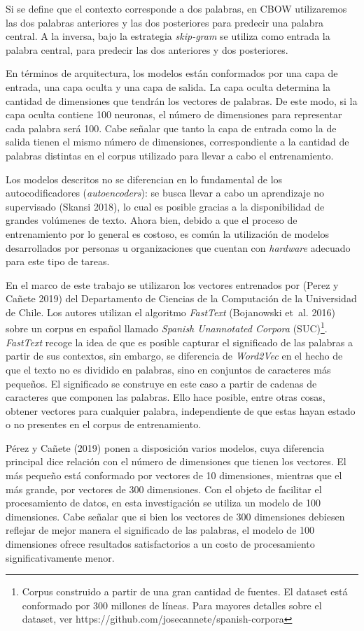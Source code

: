 \documentclass[
  12pt,
]{article}
\begin{document}
Si se define que el contexto corresponde a dos palabras, en CBOW
utilizaremos las dos palabras anteriores y las dos posteriores para
predecir una palabra central. A la inversa, bajo la estrategia
\emph{skip-gram} se utiliza como entrada la palabra central, para
predecir las dos anteriores y dos posteriores.

En términos de arquitectura, los modelos están conformados por una capa
de entrada, una capa oculta y una capa de salida. La capa oculta
determina la cantidad de dimensiones que tendrán los vectores de
palabras. De este modo, si la capa oculta contiene 100 neuronas, el
número de dimensiones para representar cada palabra será 100. Cabe
señalar que tanto la capa de entrada como la de salida tienen el mismo
número de dimensiones, correspondiente a la cantidad de palabras
distintas en el corpus utilizado para llevar a cabo el entrenamiento.

Los modelos descritos no se diferencian en lo fundamental de los
autocodificadores (\emph{autoencoders}): se busca llevar a cabo un
aprendizaje no supervisado (Skansi 2018), lo cual es posible gracias a
la disponibilidad de grandes volúmenes de texto. Ahora bien, debido a
que el proceso de entrenamiento por lo general es costoso, es común la
utilización de modelos desarrollados por personas u organizaciones que
cuentan con \emph{hardware} adecuado para este tipo de tareas.

En el marco de este trabajo se utilizaron los vectores entrenados por
(Perez y Cañete 2019) del Departamento de Ciencias de la Computación de
la Universidad de Chile. Los autores utilizan el algoritmo
\emph{FastText} (Bojanowski et~al. 2016) sobre un corpus en español
llamado \emph{Spanish Unannotated Corpora}
(SUC)\footnote{Corpus construido a partir de una gran cantidad de fuentes. El dataset está conformado por 300 millones de líneas. Para mayores detalles sobre el dataset, ver https://github.com/josecannete/spanish-corpora}.
\emph{FastText} recoge la idea de que es posible capturar el significado
de las palabras a partir de sus contextos, sin embargo, se diferencia de
\emph{Word2Vec} en el hecho de que el texto no es dividido en palabras,
sino en conjuntos de caracteres más pequeños. El significado se
construye en este caso a partir de cadenas de caracteres que componen
las palabras. Ello hace posible, entre otras cosas, obtener vectores
para cualquier palabra, independiente de que estas hayan estado o no
presentes en el corpus de entrenamiento.

Pérez y Cañete (2019) ponen a disposición varios modelos, cuya
diferencia principal dice relación con el número de dimensiones que
tienen los vectores. El más pequeño está conformado por vectores de 10
dimensiones, mientras que el más grande, por vectores de 300
dimensiones. Con el objeto de facilitar el procesamiento de datos, en
esta investigación se utiliza un modelo de 100 dimensiones. Cabe señalar
que si bien los vectores de 300 dimensiones debiesen reflejar de mejor
manera el significado de las palabras, el modelo de 100 dimensiones
ofrece resultados satisfactorios a un costo de procesamiento
significativamente menor.
\end{document}
